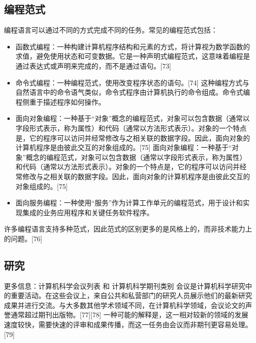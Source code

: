 \subsection{编程范式}   
编程语言可以通过不同的方式完成不同的任务。常见的编程范式包括：
\begin{itemize}
\item 函数式编程：一种构建计算机程序结构和元素的方式，将计算视为数学函数的求值，避免使用状态和可变数据。它是一种声明式编程范式，这意味着编程是通过表达式或声明来完成的，而不是通过语句。[73]     
\item 命令式编程：一种编程范式，使用改变程序状态的语句。[74] 这种编程方式与自然语言中的命令语气类似，命令式程序由计算机执行的命令组成。命令式编程侧重于描述程序如何操作。
\item 面向对象编程：一种基于“对象”概念的编程范式，对象可以包含数据（通常以字段形式表示，称为属性）和代码（通常以方法形式表示）。对象的一个特点是，它的程序可以访问并经常修改与之相关联的数据字段。因此，面向对象的计算机程序是由彼此交互的对象组成的。[75]  
面向对象编程：一种基于“对象”概念的编程范式，对象可以包含数据（通常以字段形式表示，称为属性）和代码（通常以方法形式表示）。对象的一个特点是，它的程序可以访问并经常修改与之相关联的数据字段。因此，面向对象的计算机程序是由彼此交互的对象组成的。[75]  
\item 面向服务编程：一种使用“服务”作为计算工作单元的编程范式，用于设计和实现集成的业务应用程序和关键任务软件程序。
\end{itemize}  
许多编程语言支持多种范式，因此范式的区别更多的是风格上的，而非技术能力上的问题。[76]
\subsection{研究}  
更多信息：计算机科学会议列表 和 计算机科学期刊类别  
会议是计算机科学研究中的重要活动。在这些会议上，来自公共和私营部门的研究人员展示他们的最新研究成果并进行交流。与大多数其他学术领域不同，在计算机科学领域，会议论文的声誉通常超过期刊出版物。[77][78] 一种可能的解释是，这一相对较新的领域的发展速度较快，需要快速的评审和成果传播，而这一任务由会议而非期刊更容易处理。[79]